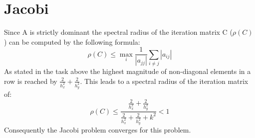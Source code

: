 \section{Jacobi}

Since A is strictly dominant the spectral radius of the iteration matrix C ($\rho(C)$) can be computed by the following formula:\\
\begin{equation}
	\rho(C) \leq \max\limits_{i}\frac{1}{|a_{jj}|}\sum\limits_{i \neq j}|a_{ij}|
\end{equation}
As stated in the task above the highest magnitude of non-diagonal elements in a row is reached by $\frac{2}{h_{x}^{2}} + \frac{2}{h_{y}^{2}}$. This leads to a spectral radius of the iteration matrix of:
\begin{equation}
	\rho(C) \leq \frac{\frac{2}{h_{x}^{2}} + \frac{2}{h_{y}^{2}}}{\frac{2}{h_{x}^{2}} + \frac{2}{h_{y}^{2}} + k^{2}} < 1
\end{equation}
Consequently the Jacobi problem converges for this problem.
